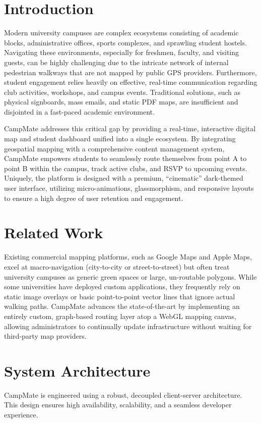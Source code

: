 \documentclass[conference]{IEEEtran}
\begin{document}
\section{Introduction}
Modern university campuses are complex ecosystems consisting of academic blocks, administrative offices, sports complexes, and sprawling student hostels. Navigating these environments, especially for freshmen, faculty, and visiting guests, can be highly challenging due to the intricate network of internal pedestrian walkways that are not mapped by public GPS providers. Furthermore, student engagement relies heavily on effective, real-time communication regarding club activities, workshops, and campus events. Traditional solutions, such as physical signboards, mass emails, and static PDF maps, are insufficient and disjointed in a fast-paced academic environment.

CampMate addresses this critical gap by providing a real-time, interactive digital map and student dashboard unified into a single ecosystem. By integrating geospatial mapping with a comprehensive content management system, CampMate empowers students to seamlessly route themselves from point A to point B within the campus, track active clubs, and RSVP to upcoming events. Uniquely, the platform is designed with a premium, ``cinematic'' dark-themed user interface, utilizing micro-animations, glassmorphism, and responsive layouts to ensure a high degree of user retention and engagement.

\section{Related Work}
Existing commercial mapping platforms, such as Google Maps and Apple Maps, excel at macro-navigation (city-to-city or street-to-street) but often treat university campuses as generic green spaces or large, un-routable polygons. While some universities have deployed custom applications, they frequently rely on static image overlays or basic point-to-point vector lines that ignore actual walking paths. CampMate advances the state-of-the-art by implementing an entirely custom, graph-based routing layer atop a WebGL mapping canvas, allowing administrators to continually update infrastructure without waiting for third-party map providers.

\section{System Architecture}
CampMate is engineered using a robust, decoupled client-server architecture. This design ensures high availability, scalability, and a seamless developer experience.
\end{document}
